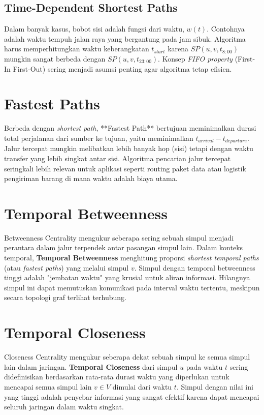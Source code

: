 \documentclass[12pt,a4paper]{book}
\begin{document}
\subsection{Time-Dependent Shortest Paths}
Dalam banyak kasus, bobot sisi adalah fungsi dari waktu, $w(t)$. Contohnya adalah waktu tempuh jalan raya yang bergantung pada jam sibuk. Algoritma harus memperhitungkan waktu keberangkatan $t_{start}$ karena $SP(u, v, t_{8:00})$ mungkin sangat berbeda dengan $SP(u, v, t_{23:00})$. Konsep \textit{FIFO property} (First-In First-Out) sering menjadi asumsi penting agar algoritma tetap efisien.

\section{Fastest Paths}
Berbeda dengan \textit{shortest path}, **Fastest Path** bertujuan meminimalkan durasi total perjalanan dari sumber ke tujuan, yaitu meminimalkan $t_{arrival} - t_{departure}$.
Jalur tercepat mungkin melibatkan lebih banyak hop (sisi) tetapi dengan waktu transfer yang lebih singkat antar sisi.
Algoritma pencarian jalur tercepat seringkali lebih relevan untuk aplikasi seperti routing paket data atau logistik pengiriman barang di mana waktu adalah biaya utama.

\section{Temporal Betweenness}
Betweenness Centrality mengukur seberapa sering sebuah simpul menjadi perantara dalam jalur terpendek antar pasangan simpul lain.
Dalam konteks temporal, \textbf{Temporal Betweenness} menghitung proporsi \textit{shortest temporal paths} (atau \textit{fastest paths}) yang melalui simpul $v$. Simpul dengan temporal betweenness tinggi adalah "jembatan waktu" yang krusial untuk aliran informasi. Hilangnya simpul ini dapat memutuskan komunikasi pada interval waktu tertentu, meskipun secara topologi graf terlihat terhubung.

\section{Temporal Closeness}
Closeness Centrality mengukur seberapa dekat sebuah simpul ke semua simpul lain dalam jaringan.
\textbf{Temporal Closeness} dari simpul $u$ pada waktu $t$ sering didefinisikan berdasarkan rata-rata durasi waktu yang diperlukan untuk mencapai semua simpul lain $v \in V$ dimulai dari waktu $t$. Simpul dengan nilai ini yang tinggi adalah penyebar informasi yang sangat efektif karena dapat mencapai seluruh jaringan dalam waktu singkat.
\end{document}
